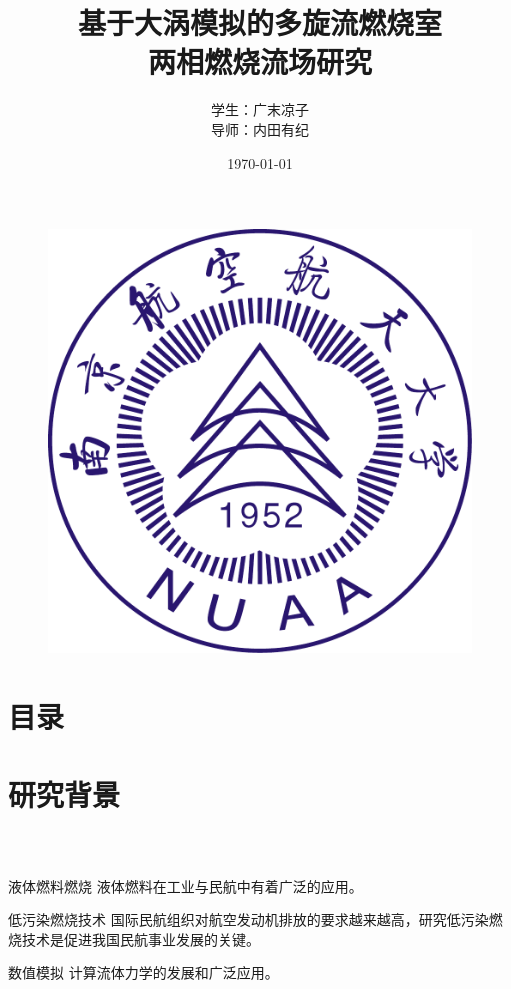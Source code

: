 \documentclass[compress]{beamer}%
\begin{document}
\graphicspath{{figures/}} %
\captionsetup[figure]{font=footnotesize,labelfont=footnotesize}

\title{基于大涡模拟的多旋流燃烧室\\两相燃烧流场研究}
\author[广末凉子]{学生：广末凉子\\ \vskip 5pt 导师：内田有纪}
\date{\small \vskip -22pt \today}
\begin{frame}
	\vspace{-10mm}
		\maketitle
	\vspace{-44mm}
	\begin{figure}[htbp]
		\begin{center}
			\includegraphics[width=0.14\linewidth]{logo.pdf}
		\end{center}
	\end{figure}
\end{frame}
\section*{目录}
\begin{frame}
	\frametitle{\secname}
	\tableofcontents[sections={<1-5>}]
\end{frame}
  



\section{研究背景}
\begin{frame}
	\frametitle{\secname~ }
	\begin{block}{液体燃料燃烧}
		液体燃料在工业与民航中有着广泛的应用。
	\end{block}
	\begin{block}{低污染燃烧技术}
		国际民航组织对航空发动机排放的要求越来越高，研究低污染燃烧技术是促进我国民航事业发展的关键。
	\end{block}
	\begin{block}{数值模拟}
		计算流体力学的发展和广泛应用。
	\end{block}
\end{frame}
\end{document}
